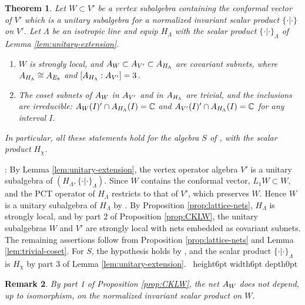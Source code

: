 \documentclass[leqno]{article}
\newcommand{\Cbb}{\ensuremath{\mathbb{C}}}
\let\cal\relax
\newcommand{\cal}{\mathcal}
\newcommand{\qed}{\hfill \vrule height6pt  width6pt depth0pt}
\newtheorem{thm}{Theorem}[section]
\newtheorem{remark}[thm]{Remark}
\newenvironment{proof}[1][]{\noindent {\it Proof #1} : }{\hbox{~}\qed
\smallskip
}
\numberwithin{equation}{section}
\begin{document}
\begin{thm}
\label{thm:strong-locality}
Let $W \subset V'$ be a vertex subalgebra containing the conformal vector of $V'$ which is a unitary subalgebra for a normalized invariant scalar product $\{\cdot|\cdot\}$ on $V'$. Let $\Lambda$ be an isotropic line and equip $H_\Lambda$ with the scalar product $\{\cdot|\cdot\}_\Lambda$ of Lemma \ref{lem:unitary-extension}.
\begin{enumerate}
\item $W$ is strongly local, and $\cal A_W \subset \cal A_{V'} \subset \cal A_{H_\Lambda}$ are covariant subnets, where $\cal A_{H_\Lambda} \cong \cal A_{E_8}$ and $[\cal A_{H_\Lambda} : \cal A_{V'}] = 3$.
\item The coset subnets of $\cal A_W$ in $\cal A_{V'}$ and in $\cal A_{H_\Lambda}$ are trivial, and the inclusions are irreducible: $\cal A_W(I)' \cap \cal A_{H_\Lambda}(I) = \Cbb$ and $\cal A_{V'}(I)' \cap \cal A_{H_\Lambda}(I) = \Cbb$ for any interval $I$.
\end{enumerate}
In particular, all these statements hold for the algebra $S$ of \cite[Theorem 10.10]{Arh26}, with the scalar product $H_\chi$.
\end{thm}

\begin{proof}
By Lemma \ref{lem:unitary-extension}, the vertex operator algebra $V'$ is a unitary subalgebra of $(H_\Lambda,\{\cdot|\cdot\}_\Lambda)$. Since $W$ contains the conformal vector, $L_1W \subset W$, and the PCT operator of $H_\Lambda$ restricts to that of $V'$, which preserves $W$. Hence $W$ is a unitary subalgebra of $H_\Lambda$ by \cite[Proposition 5.23 p.~43]{CKLW18}. By Proposition \ref{prop:lattice-nets}, $H_\Lambda$ is strongly local, and by part 2 of Proposition \ref{prop:CKLW}, the unitary subalgebras $W$ and $V'$ are strongly local with nets embedded as covariant subnets. The remaining assertions follow from Proposition \ref{prop:lattice-nets} and Lemma \ref{lem:trivial-coset}. For $S$, the hypothesis holds by \cite[Theorem 10.10]{Arh26}, and the scalar product $\{\cdot|\cdot\}_\Lambda$ is $H_\chi$ by part 3 of Lemma \ref{lem:unitary-extension}.
\end{proof}

\begin{remark}\normalfont
By part 1 of Proposition \ref{prop:CKLW}, the net $\cal A_W$ does not depend, up to isomorphism, on the normalized invariant scalar product on $W$.
\end{remark}
\end{document}
